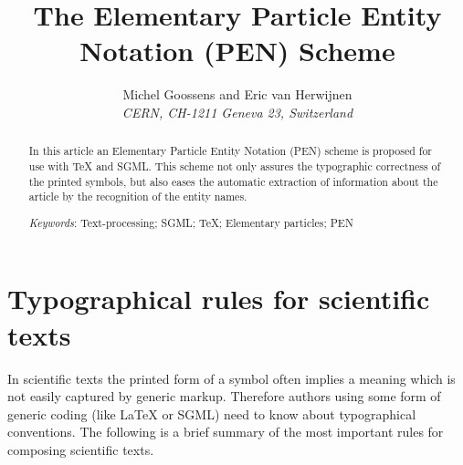 \documentclass{article}
\begin{document}
\title{The Elementary Particle Entity Notation (PEN) Scheme}
\author{Michel Goossens and Eric van Herwijnen\\
\it CERN, CH-1211 Geneva 23, Switzerland}
\maketitle
\begin{abstract}
In this article an Elementary Particle Entity Notation (PEN)
scheme is
proposed for use with \TeX{} and SGML. This scheme not only assures
the typographic correctness of the printed symbols, but also
eases the automatic extraction of information about the
article by the recognition of the entity names.
\par\vspace{\baselineskip}
{\it Keywords\/}:
Text-processing; SGML; \TeX; Elementary particles; PEN
\end{abstract}
 
\section[]{Typographical rules for scientific texts}
 
In scientific texts the printed  form of a symbol
often implies a meaning which is not easily captured by generic markup.
Therefore authors using some form
of generic coding (like \LaTeX{} or SGML) need to know about
typographical conventions.
The following is a brief summary of the most important
rules for composing scientific texts\cite{IUPAP,LOWE}.
 
\end{document}
